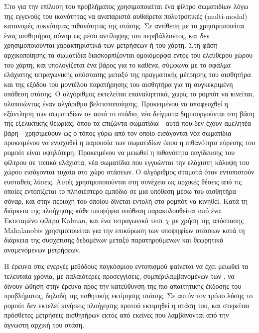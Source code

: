 Στο \cite{Gasparri2007a} για την επίλυση του προβλήματος χρησιμοποιείται ένα
φίλτρο σωματιδίων λόγω της εγγενούς του ικανότητας να αναπαριστά αυθαίρετα
πολυτροπικές (multi-modal) κατανομές πυκνότητας πιθανότητας της στάσης.
Σε αντίθεση με το \cite{Jensfelt2001a} χρησιμοποιείται ένας αισθητήρας
σόναρ ως μέσο αντίληψης του περιβάλλοντος, και δεν χρησιμοποιούνται
χαρακτηριστικά των μετρήσεων ή του χάρτη.  Στη φάση αρχικοποίησης τα σωματίδια
διασκορπίζονται ομοιόμορφα εντός του ελεύθερου χώρου του χάρτη, και
υπολογίζεται ένα βάρος για το καθένα, σύμφωνα με το σφάλμα ελάχιστης
τετραγωνικής απόστασης μεταξύ της πραγματικής μέτρησης του αισθητήρα και της
εξόδου του μοντέλου παρατήρησης του αισθητήρα για τη συγκεκριμένη υπόθεση
στάσης. Ο αλγόριθμος εκτελείται επαναληπτικά, χωρίς το ρομπότ να κινείται,
υλοποιώντας έναν αλγόριθμο βελτιστοποίησης. Προκειμένου να αποφευχθεί η
εξάντληση των σωματιδίων σε αυτό το στάδιο, νέα δείγματα δημιουργούνται στη
βάση της εξελικτικής θεωρίας, όπου τα επιζώντα σωματίδια---αυτά που δεν έχουν
αμελητέα βάρη---χρησιμεύουν ως ο τόπος γύρω από τον οποίο εισάγονται νέα
σωματίδια προκειμένου να ενισχυθεί η παρουσία των σωματιδίων όπου η πιθανότητα
εύρεσης του ρομπότ είναι υψηλότερη. Προκειμένου να μειωθεί η πιθανότητα
παγίδευσης του φίλτρου σε τοπικά ελάχιστα, νέα σωματίδια που εγγυώνται την
ελάχιστη κάλυψη του χώρου εισάγονται τυχαία στο χώρο στάσεων. Ο αλγόριθμος
σταματά όταν εντοπιστούν ευσταθείς λύσεις. Αυτές χρησιμοποιούνται στη συνέχεια
ως αρχικές θέσεις από τις οποίες εντοπίζεται το πλησιέστερο εμπόδιο σε μια
υπόθεση μέσω του αισθητήρα σόναρ, και στην περιοχή του οποίου δίνεται εντολή
στο ρομπότ να κινηθεί. Κατά τη διάρκεια της πλοήγησης κάθε υποψήφια υπόθεση
παρακολουθείται από ένα Εκτεταμένο φίλτρο Kalman, και ένα τετραγωνικό τεστ
$\chi$ με χρήση της απόστασης Mahalanobis χρησιμοποιείται για την επικύρωση των
υποψηφίων στάσεων κατά τη διάρκεια της συσχέτισης δεδομένων μεταξύ
παρατηρούμενων και θεωρητικά αναμενόμενων μετρήσεων.

Η έρευνα στις ενεργές μεθόδους παγκόσμιου εντοπισμού φαίνεται να έχει μειωθεί
τα τελευταία χρόνια, με παλαιότερες προσεγγίσεις, συμπεριλαμβανομένων των
\cite{Manasse1988,Kleinberg,Romanik1996,Dudek1998,OKanea,Rao2007}, να δίνουν
ώθηση στην έρευνα προς την κατεύθυνση της πιο απαιτητικής έκδοσης του
προβλήματος, δηλαδή της παθητικής εκτίμησης στάσης. Σε αυτόν τον τρόπο
λύσης το ρομπότ δεν εκτελεί κινήσεις πλοήγησης προτού εκτιμηθεί η στάση του,
και στερείται πρόσθετες μετρήσεις αισθητήρων εκτός από εκείνες που λαμβάνονται
από την άγνωστη αρχική του στάση.

